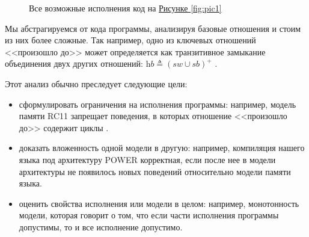\documentclass[times
              ]{itmo-student-thesis}
\begin{document}
\begin{figure}[!h]
\begin{minipage}[c][1\width]{0.3\textwidth}
    \end{minipage}
    \caption{Все возможные исполнения код на \hyperref[fig:pic1]{Рисунке \ref{fig:pic1}}}
    \label{fig:pic2}
  \end{figure}

  Мы абстрагируемся от кода программы, анализируя базовые отношения и стоим из них более сложные. Так
  например, одно из ключевых отношений <<произошло до>> может определяется как транзитивное замыкание
  объединения двух других отношений: $ \textit{hb} \triangleq (\textit{sw} \cup \textit{sb})^+ $ \cite{rc11}.

  Этот анализ обычно преследует следующие цели:
  \begin{itemize}
    \item сформулировать ограничения на исполнения программы:
    например, модель памяти RC11 запрещает поведения, в которых отношение <<произошло до>> содержит
    циклы \cite{rc11}.
    \item доказать вложенность одной модели в другую:
    например, компиляция нашего языка под архитектуру POWER корректная, если после нее в модели
    архитектуры\cite{axiomatic_memory_model_for_power_mp} не появилось новых поведений относительно
    модели памяти языка.
    \item оценить свойства исполнения или модели в целом:
    например, монотонность модели, которая говорит о том, что если части исполнения программы
    допустимы, то и все исполнение допустимо.

  \end{itemize}
\end{document}

